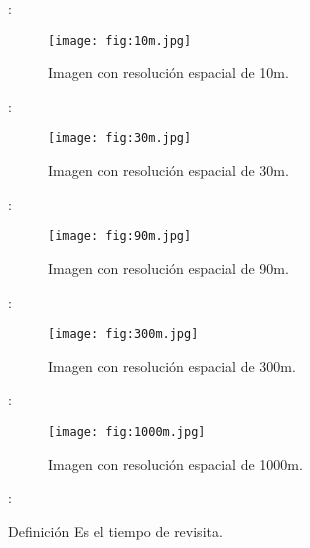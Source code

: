 
\begin{frame}{\secname : \subsecname}
    \begin{figure}[h!]
        \centering
        \texttt{[image: fig:10m.jpg]}
        \caption{Imagen con resolución espacial de 10m.}
    \end{figure}
\end{frame}

\begin{frame}{\secname : \subsecname}
    \begin{figure}[h!]
        \centering
        \texttt{[image: fig:30m.jpg]}
        \caption{Imagen con resolución espacial de 30m.}
    \end{figure}
\end{frame}

\begin{frame}{\secname : \subsecname}
    \begin{figure}[h!]
        \centering
        \texttt{[image: fig:90m.jpg]}
        \caption{Imagen con resolución espacial de 90m.}
    \end{figure}
\end{frame}

\begin{frame}{\secname : \subsecname}
    \begin{figure}[h!]
        \centering
        \texttt{[image: fig:300m.jpg]}
        \caption{Imagen con resolución espacial de 300m.}
    \end{figure}
\end{frame}

\begin{frame}{\secname : \subsecname}
    \begin{figure}[h!]
        \centering
        \texttt{[image: fig:1000m.jpg]}
        \caption{Imagen con resolución espacial de 1000m.}
    \end{figure}
\end{frame}


\begin{frame}{\secname : \subsecname}
    \begin{block}{Definición}
        Es el tiempo de revisita.
    \end{block}
\end{frame}

